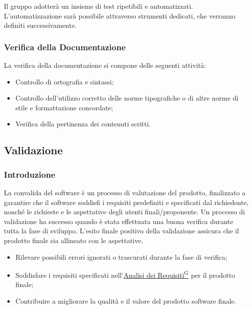 Il gruppo adotterà un insieme di test ripetibili e automatizzati. L’automatizzazione sarà possibile attraverso strumenti dedicati, che verranno definiti successivamente.

\subsubsection*{Verifica della Documentazione}
La verifica della documentazione si compone delle seguenti attività:
\begin{itemize}
    \item Controllo di ortografia e sintassi;
    \item Controllo dell’utilizzo corretto delle norme tipografiche o di altre norme di stile e formattazione concordate;
    \item Verifica della pertinenza dei contenuti scritti.
\end{itemize}








\subsection{Validazione}
\subsubsection{Introduzione}
La convalida del software è un processo di valutazione del prodotto, finalizzato a garantire che il 
software soddisfi i requisiti predefiniti e specificati dal richiedente, nonché le richieste e le aspettative 
degli utenti finali/proponente. Un processo di validazione ha successo quando è stata effettuata una buona 
verifica durante tutta la fase di sviluppo.
L’esito finale positivo della validazione assicura che il prodotto finale sia allineato con le aspettative.
\begin{itemize}
    \item Rilevare possibili errori ignorati o trascurati durante la fase di verifica;
    \item Soddisfare i requisiti specificati nell’\href{https://code7crusaders.github.io/docs/RTB/documentazione_interna/glossario.html#analisi-dei-requisiti}{Analisi dei Requisiti\textsuperscript{G}} per il prodotto finale;
    \item Contribuire a migliorare la qualità e il valore del prodotto software finale.
\end{itemize}
